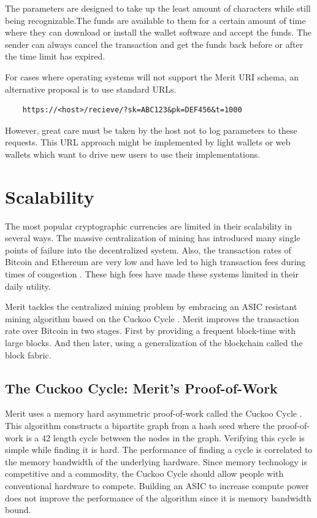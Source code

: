 \documentclass{article}
\begin{document}
The parameters are designed to take up the least amount of characters while
still being recognizable.The funds are available to them for a certain amount of
time where they can download or install the wallet software and accept the funds.
The sender can always cancel the transaction and get the funds back before or
after the time limit has expired.

For cases where operating systems will not support the Merit URI schema, an
alternative proposal is to use standard URLs.

\begin{verbatim}
    https://<host>/recieve/?sk=ABC123&pk=DEF456&t=1000
\end{verbatim}

However, great care must be taken by the host not to log parameters to these
requests.  This URL approach might be implemented by light wallets or web wallets
which want to drive new users to use their implementations.

\section{Scalability}

The most popular cryptographic currencies are limited in their scalability
in several ways.  The massive centralization of mining has introduced many single
points of failure into the decentralized system.  Also, the transaction
rates of Bitcoin and Ethereum are very low and have led to high transaction fees
during times of congestion \cite{fees}.  These high fees have made these systems limited
in their daily utility.

Merit tackles the centralized mining problem by embracing an ASIC resistant
mining algorithm based on the Cuckoo Cycle \cite{cuckoo}.  Merit improves the
transaction rate over Bitcoin in two stages.  First by providing a frequent block-time with large blocks.  And then later, using a generalization of the blockchain
called the \gls{block fabric}.

\subsection{The Cuckoo Cycle: Merit's Proof-of-Work}

Merit uses a memory hard asymmetric proof-of-work called the Cuckoo Cycle \cite{cuckoo}. 
This algorithm constructs a bipartite graph from a hash seed where the
proof-of-work is a 42 length cycle between the nodes in the graph.  Verifying
this cycle is simple while finding it is hard.  The performance of finding a
cycle is correlated to the memory bandwidth of the underlying hardware.  Since
memory technology is competitive and a commodity, the Cuckoo Cycle should allow
people with conventional hardware to compete.  Building an ASIC to increase compute
power does not improve the performance of the algorithm since it is memory
bandwidth bound.
\end{document}
